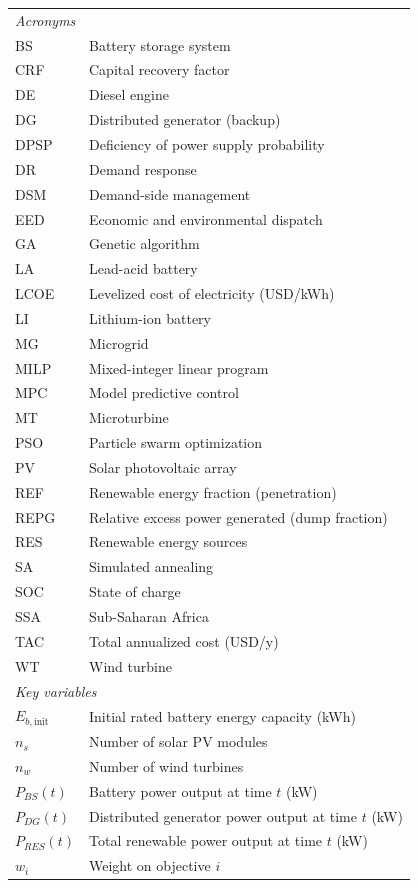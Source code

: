 \documentclass[final,3p,times]{elsarticle}
\begin{document}
\begin{tabular}{ll}
\multicolumn{2}{l}{\textit{Acronyms}} \\
BS  & Battery storage system \\
CRF & Capital recovery factor \\
DE  & Diesel engine \\
DG  & Distributed generator (backup) \\
DPSP & Deficiency of power supply probability \\
DR  & Demand response \\
DSM & Demand-side management \\
EED & Economic and environmental dispatch \\
GA  & Genetic algorithm \\
LA  & Lead-acid battery \\
LCOE & Levelized cost of electricity (USD/kWh) \\
LI  & Lithium-ion battery \\
MG  & Microgrid \\
MILP & Mixed-integer linear program \\
MPC & Model predictive control \\
MT  & Microturbine \\
PSO & Particle swarm optimization \\
PV  & Solar photovoltaic array \\
REF & Renewable energy fraction (penetration) \\
REPG & Relative excess power generated (dump fraction) \\
RES & Renewable energy sources \\
SA  & Simulated annealing \\
SOC & State of charge \\
SSA & Sub-Saharan Africa \\
TAC & Total annualized cost (USD/y) \\
WT  & Wind turbine \\[6pt]
\multicolumn{2}{l}{\textit{Key variables}} \\
$E_{b,\text{init}}$ & Initial rated battery energy capacity (kWh) \\
$n_s$ & Number of solar PV modules \\
$n_w$ & Number of wind turbines \\
$P_{BS}(t)$ & Battery power output at time $t$ (kW) \\
$P_{DG}(t)$ & Distributed generator power output at time $t$ (kW) \\
$P_{RES}(t)$ & Total renewable power output at time $t$ (kW) \\
$w_i$ & Weight on objective $i$ \\
\end{tabular}
\end{document}
